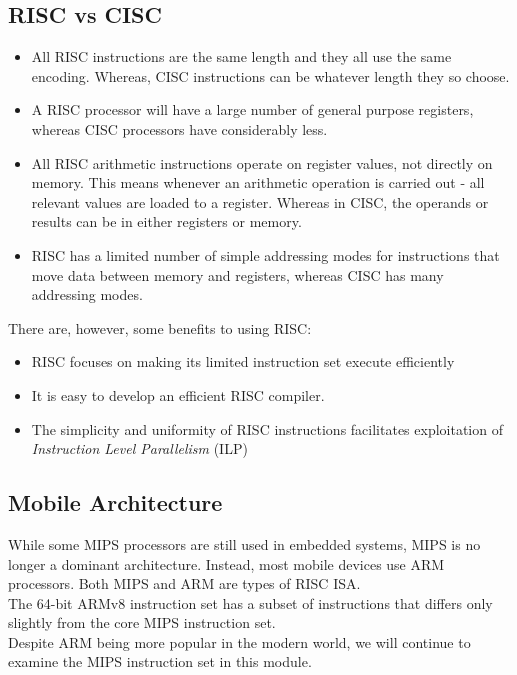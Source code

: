 \subsection{RISC vs CISC}
\begin{itemize}
    \item All RISC instructions are the same length and they all use the same encoding. Whereas, CISC instructions can be whatever length they so choose.
    \item A RISC processor will have a large number of general purpose registers, whereas CISC processors have considerably less.
    \item All RISC arithmetic instructions operate on register values, not directly on memory. This means whenever an arithmetic operation is carried out - all relevant values are loaded to a register. Whereas in CISC, the operands or results can be in either registers or memory.
    \item RISC has a limited number of simple addressing modes for instructions that move data between memory and registers, whereas CISC has many addressing modes.
\end{itemize}
There are, however, some benefits to using RISC:
\begin{itemize}
    \item RISC focuses on making its limited instruction set execute efficiently
    \item It is easy to develop an efficient RISC compiler.
    \item The simplicity and uniformity of RISC instructions facilitates exploitation of \textit{Instruction Level Parallelism} (ILP)
\end{itemize}

\subsection{Mobile Architecture}
While some MIPS processors are still used in embedded systems, MIPS is no longer a dominant architecture. Instead, most mobile devices use ARM processors. Both MIPS and ARM are types of RISC ISA.\\

The 64-bit ARMv8 instruction set has a subset of instructions that differs only slightly from the core MIPS instruction set.\\

Despite ARM being more popular in the modern world, we will continue to examine the MIPS instruction set in this module. 

